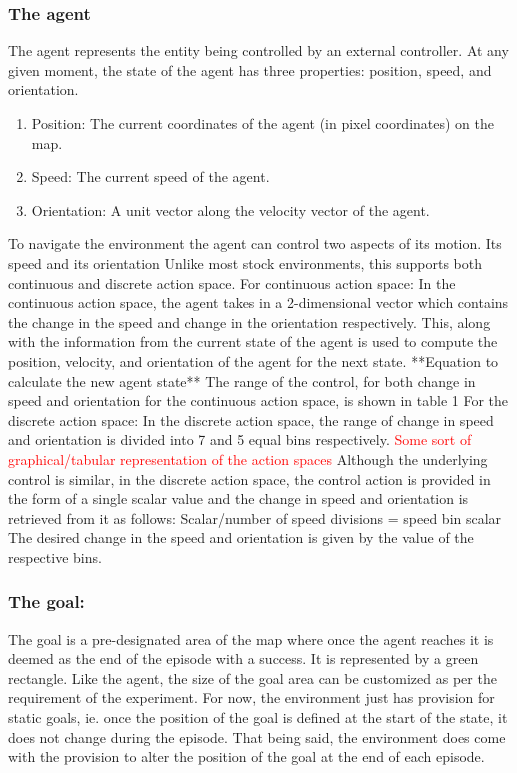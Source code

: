 \subsubsection*{The agent}
The agent represents the entity being controlled by an external controller. At any given moment, the state of the agent has three properties: position, speed, and orientation.
\begin{enumerate}
	\item Position: The current coordinates of the agent (in pixel coordinates) on the map.
	\item Speed: The current speed of the agent.
	\item Orientation: A unit vector along the velocity vector of the agent.
\end{enumerate}
To navigate the environment the agent can control two aspects of its motion. Its speed and its orientation
Unlike most stock environments, this supports both continuous and discrete action space. 
For continuous action space:
In the continuous action space, the agent takes in a 2-dimensional vector which contains the change in the speed and change in the orientation respectively. This, along with the information from the current state of the agent is used to compute the position, velocity, and orientation of the agent for the next state.
**Equation to calculate the new agent state**
The range of the control, for both change in speed and orientation for the continuous action space, is shown in table 1
For the discrete action space:
In the discrete action space, the range of change in speed and orientation is divided into 7 and 5 equal bins respectively. \textcolor{red}{Some sort of graphical/tabular representation of the action spaces}
Although the underlying control is similar, in the discrete action space, the control action is provided in the form of  a single scalar value and the change in speed and orientation is retrieved from it as follows:
Scalar/number of speed divisions = speed bin
scalar%
The desired change in the speed and orientation is given by the value of the respective bins. 

\subsubsection*{The goal:}
The goal is a pre-designated area of the map where once the agent reaches it is deemed as the end of the episode with a success. It is represented by a green rectangle. Like the agent, the size of the goal area can be customized as per the requirement of the experiment. For now, the environment just has provision for static goals, ie. once the position of the goal is defined at the start of the state, it does not change during the episode. That being said, the environment does come with the provision to alter the position of the goal at the end of each episode.


